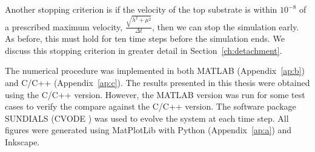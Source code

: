    Another stopping criterion is if the velocity of the top substrate is within $10^{-8}$ of a prescribed maximum velocity, $\frac{\sqrt{\lambda^2 + \mu^2}}{\Delta t}$, then we can stop the simulation early. As before, this must hold for ten time steps before the simulation ends. We discuss this stopping criterion in greater detail in Section~\ref{ch:detachment}.
   
   The numerical procedure was implemented in both MATLAB \cite{MATLAB2010} (Appendix~\ref{ap:b}) and C/C++ (Appendix~\ref{ap:c}). The results presented in this thesis were obtained using the C/C++ version. However, the MATLAB version was run for some test cases to verify the compare against the C/C++ version. The software package SUNDIALS (CVODE \cite{sundials}) was used to evolve the system at each time step. All figures were generated using MatPlotLib \cite{Hunter2007} with Python (Appendix~\ref{ap:a}) and Inkscape.
